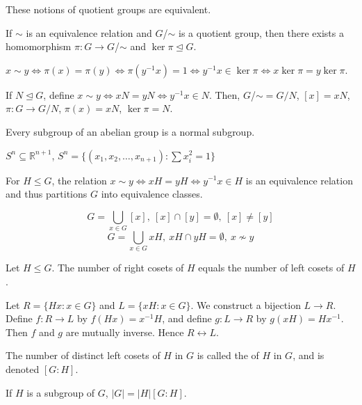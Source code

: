 \documentclass{mathnotes}
\begin{document}
These notions of quotient groups are equivalent.

\begin{prop}
  If $\sim$ is an equivalence relation and $G$/$\sim$ is a quotient group, then
  there exists a homomorphism $\pi:G\rightarrow G$/$\sim$ and $\ker\pi\unlhd
  G$.
\end{prop}

\begin{pf}
  $x\sim y\Leftrightarrow \pi(x)=\pi(y)\Leftrightarrow
  \pi(y^{-1}x)=1\Leftrightarrow y^{-1}x\in\ker\pi\Leftrightarrow
  x\ker\pi=y\ker\pi$.
\end{pf}

If $N\unlhd G$, define $x\sim y\Leftrightarrow xN=yN\Leftrightarrow y^{-1}x\in
N$. Then, $G$/$\sim=G/N$, $[x]=xN$, $\pi:G\to G/N$, $\pi(x)=xN$, $\ker\pi=N$.

\begin{prop}
  Every subgroup of an abelian group is a normal subgroup.
\end{prop}

\begin{defi}
  $S^n\subseteq\mathbb{R}^{n+1}$, $S^n=\{(x_1,x_2,\ldots,x_{n+1}):\sum
  x_i^2=1\}$
\end{defi}

For $H\le G$, the relation $x\sim y\Leftrightarrow xH=yH\Leftrightarrow
y^{-1}x\in H$ is an equivalence relation and thus partitions $G$ into
equivalence classes.

$$G=\bigcup\limits_{x\in G}[x],\ [x]\cap[y]=\emptyset,\ [x]\ne[y]$$
$$G=\bigcup\limits_{x\in G}xH,\ xH\cap yH=\emptyset,\ x\nsim y$$

\begin{prop}
  Let $H\le G$. The number of right cosets of $H$ equals the number of left
  cosets of $H$.
\end{prop}

\begin{pf}
  Let $R=\{Hx:x\in G\}$ and $L=\{xH:x\in G\}$. We construct a bijection
  $L\rightarrow R$. Define $f:R\to L$ by $f(Hx)=x^{-1}H$, and define $g:L\to R$
  by $g(xH)=Hx^{-1}$. Then $f$ and $g$ are mutually inverse. Hence
  $R\leftrightarrow L$.
\end{pf}

\begin{defi}
  The number of distinct left cosets of $H$ in $G$ is called the 
  of $H$ in $G$, and is denoted $[G:H]$.
\end{defi}

\begin{bthm}
  If $H$ is a subgroup of $G$, $|G|=|H|[G:H]$.
\end{bthm}
\end{document}
